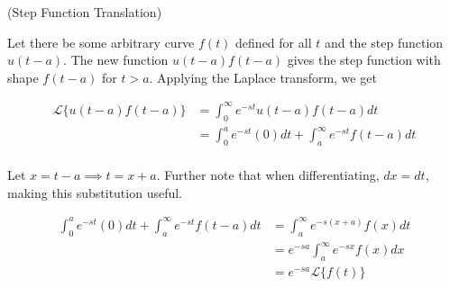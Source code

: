 \begin{definition}(Step Function Translation)

    Let there be some arbitrary curve $f(t)$ defined for all $t$ and the step function $u(t-a)$.
    The new function $u(t-a)f(t-a)$ gives the step function with shape $f(t-a)$ for $t>a$. Applying the Laplace transform, we get

    \begin{align*}
        \mathcal{L}\{u(t-a)f(t-a)\}&=\int_0^\infty e^{-st}u(t-a)f(t-a)dt\\
        &=\int_0^a e^{-st}(0)dt+\int_a^\infty e^{-st}f(t-a)dt\\
    \end{align*}

    Let $x=t-a\implies t=x+a$. Further note that when differentiating, $dx=dt$, making this substitution useful.

    \begin{align*}
        \int_0^a e^{-st}(0)dt+\int_a^\infty e^{-st}f(t-a)dt&=\int_a^\infty e^{-s(x+a)}f(x)dt\\
        &=e^{-sa}\int_a^\infty e^{-sx}f(x)dx\\
        &=e^{-sa}\mathcal{L}\{f(t)\}
    \end{align*}
\end{definition}